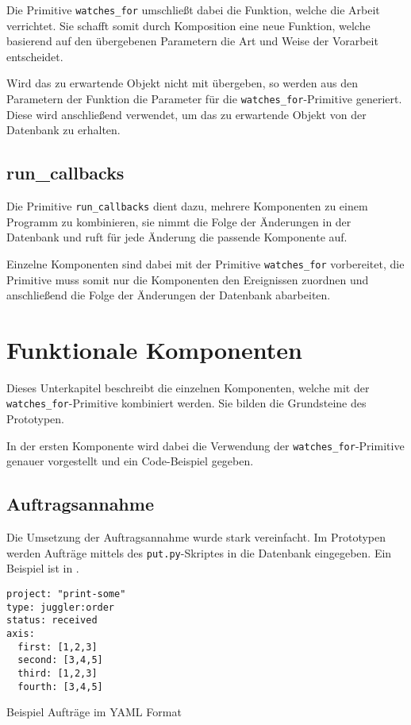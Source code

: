 Die Primitive \verb|watches_for| umschließt dabei die Funktion,
welche die Arbeit verrichtet. Sie schafft somit durch Komposition eine neue Funktion,
welche basierend auf den übergebenen Parametern die Art und Weise der Vorarbeit entscheidet.

Wird das zu erwartende Objekt nicht mit übergeben, so werden aus den Parametern der Funktion die Parameter für die \verb|watches_for|-Primitive generiert.
Diese wird anschließend verwendet, um das zu erwartende Objekt von der Datenbank zu erhalten.



\subsection{run\_callbacks}

Die Primitive \verb|run_callbacks| dient dazu, mehrere Komponenten zu einem Programm
zu kombinieren, sie nimmt die Folge der Änderungen in der Datenbank und
ruft für jede Änderung die passende Komponente auf.

Einzelne Komponenten sind dabei mit der Primitive \verb|watches_for| vorbereitet,
die Primitive muss somit nur die Komponenten den Ereignissen zuordnen
und anschließend die Folge der Änderungen der Datenbank abarbeiten.

\section{Funktionale Komponenten}

Dieses Unterkapitel beschreibt die einzelnen Komponenten, welche mit der \verb|watches_for|-Primitive kombiniert werden. Sie bilden die Grundsteine des Prototypen.

In der ersten Komponente wird dabei die Verwendung der \verb|watches_for|-Primitive genauer vorgestellt und ein Code-Beispiel gegeben.

\subsection{Auftragsannahme}

Die Umsetzung der Auftragsannahme wurde stark vereinfacht.
Im Prototypen werden Aufträge mittels des \verb|put.py|-Skriptes in die Datenbank eingegeben.
Ein Beispiel ist in .

\begin{listing}[h]
\begin{verbatim}
project: "print-some"
type: juggler:order
status: received
axis:
  first: [1,2,3]
  second: [3,4,5]
  third: [1,2,3]
  fourth: [3,4,5]
\end{verbatim}
\caption{Beispiel Auftr\"age im YAML Format}
\label{fig:auftrag-beispieldaten}
\end{listing}

